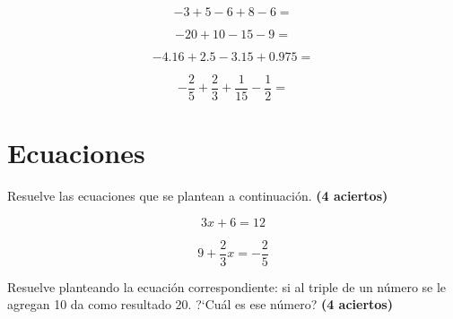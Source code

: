 \documentclass[11pt]{article}
\begin{document}
\begin{multicols}{2}

\begin{equation}
-3 +5 -6 +8 -6 =
\end{equation}

\vspace{3cm}
\begin{equation}
-20 +10 -15 -9 =
\end{equation}

\vspace{3cm}
\begin{equation}
-4.16 +2.5 -3.15 + 0.975 =
\end{equation}

\vspace{3cm}
\begin{equation}
- \frac{2}{5} + \frac{2}{3} + \frac{1}{15} - \frac{1}{2} =
\end{equation}

\vspace{3cm}

\end{multicols}

\newpage

\setcounter{equation}{0}
\section{Ecuaciones}

Resuelve las ecuaciones que se plantean a continuaci\'on. \hfill \textbf{(4 aciertos)}

\begin{multicols}{2}

\begin{equation}
3x + 6 = 12
\end{equation}

\vspace{3cm}
\begin{equation}
9 + \frac{2}{3} x = -\frac{2}{5}
\end{equation}

\vspace{3cm}

\end{multicols}

\vspace{3.5cm}
Resuelve planteando la ecuaci\'on correspondiente: si al triple de un n\'umero
se le agregan 10 da como resultado 20. ?`Cu\'al es ese n\'umero? \hfill
\textbf{(4 aciertos)}

\vspace{3.5cm}
\end{document}
